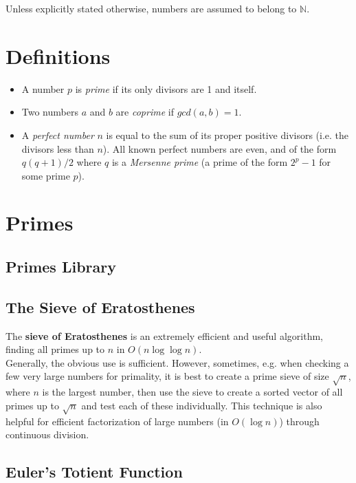 \documentclass[../main]{subfiles}
\begin{document}
Unless explicitly stated otherwise, numbers are assumed to belong to $\mathbb{N}$.

\section{Definitions}

    \begin{itemize}
    \item
        A number $p$ is \textit{prime} if its only divisors are 1 and itself.
    \item 
        Two numbers $a$ and $b$ are \textit{coprime} if $gcd(a, b) = 1$. 
    \item
        A \textit{perfect number} $n$ is equal to the sum of its proper positive divisors (i.e. the divisors less than $n$). All known perfect numbers are even, and of the form $q(q+1)/2$ where $q$ is a \textit{Mersenne prime} (a prime of the form $2^p - 1$ for some prime $p$).
    \end{itemize}

\section{Primes}

    \subsection{Primes Library}


    \subsection{The Sieve of Eratosthenes}

    The \textbf{sieve of Eratosthenes} is an extremely efficient and useful algorithm, finding all primes up to $n$ in $O(n\log\log{n})$.\\

    Generally, the obvious use is sufficient. However, sometimes, e.g. when checking a few very large numbers for primality, it is best to create a prime sieve of size $\sqrt{n}$, where $n$ is the largest number, then use the sieve to create a sorted vector of all primes up to $\sqrt{n}$ and test each of these individually. This technique is also helpful for efficient factorization of large numbers (in $O(\log n)$) through continuous division.

    \subsection{Euler's Totient Function}
\end{document}
